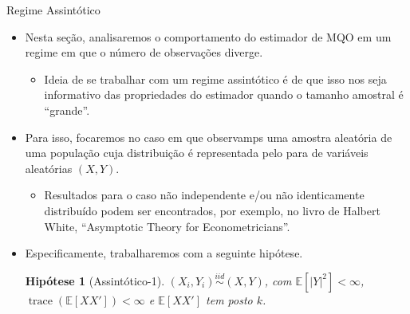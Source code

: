 \documentclass[11pt]{beamer}
\newtheorem{assumption}{Hipótese}
\begin{document}
\begin{frame}{Regime Assintótico}
	\begin{itemize}
		\item Nesta seção, analisaremos o comportamento do estimador de MQO em um regime em que o número de observações diverge.
		\begin{itemize}
			\item Ideia de se trabalhar com um regime assintótico é de que isso nos seja informativo das propriedades do estimador quando o tamanho amostral é ``grande''.
		\end{itemize}
		\item Para isso, focaremos no caso em que observamps uma amostra aleatória de uma população cuja distribuição é representada pelo para de variáveis aleatórias $(X,Y)$.
		\begin{itemize}
			\item Resultados para o caso não independente e/ou não identicamente distribuído podem ser encontrados, por exemplo, no livro de Halbert White, ``Asymptotic Theory for Econometricians''.
		\end{itemize}
		\item Especificamente, trabalharemos com a seguinte hipótese.
		\begin{assumption}[Assintótico-1]
		$(X_i,Y_i) \overset{iid}{\sim} (X,Y)$, com $\mathbb{E}[|Y|^2]<\infty$, $\operatorname{trace}(\mathbb{E}[XX']) < \infty$ e $\mathbb{E}[XX']$ tem posto $k$.
		\end{assumption}
	\end{itemize}
\end{frame}
\end{document}
